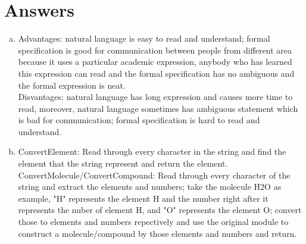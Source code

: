 \documentclass[12pt]{article}
\begin{document}
\section{Answers}

\begin{enumerate}[a)]

\item Advantages: natural language is easy to read and understand; formal specification is good for communication between people from different area because it uses a particular academic expression, anybody who has learned this expression  can read and the formal specification has no ambiguous and the formal expression is neat.\\ Disvantages: natural language has long expression and causes more time to read, moreover, natural language sometimes has ambiguous statement which is bad for communication; formal specification is hard to read and understand.
\item ConvertElement: Read through every character in the string and find the element that the string represent and return the element. \\

ConvertMolecule/ConvertCompound: Read through every character of the string and extract the elements and numbers; take the molecule H2O as example, "H" represents the element H and the number right after it represents the nuber of element H, and "O" represents the element O; convert those to elements and numbers repectively and use the original module to construct a molecule/compound by those elements and numbers and return.\\


\end{enumerate}
\end{document}
